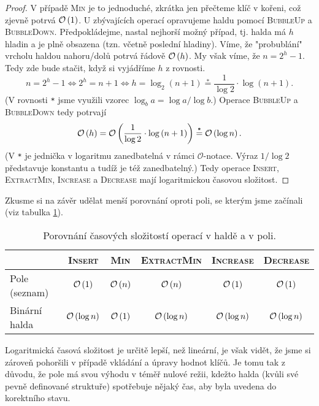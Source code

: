 \begin{proof}
    V případě \textsc{Min} je to jednoduché, zkrátka jen přečteme klíč v kořeni, což zjevně potrvá $\mathcal{O}\left(1\right)$. U zbývajících operací opravujeme haldu pomocí \textsc{BubbleUp} a \textsc{BubbleDown}. Předpokládejme, nastal nejhorší možný případ, tj. halda má $h$ hladin a je plně obsazena (tzn. včetně poslední hladiny). Víme, že "probublání" vrcholu haldou nahoru/dolů potrvá řádově $\mathcal{O}\left(h\right)$. My však víme, že $n=2^h-1$. Tedy zde bude stačit, když si vyjádříme $h$ z rovnosti.
    \[n=2^h-1 \iff 2^h=n+1 \iff h=\log_2{(n+1)}\stackrel{\texttt{*}}{=}\dfrac{1}{\log{2}}\cdot\log{(n+1)}.\]
    (V rovnosti \texttt{*} jsme využili vzorec $\log_b{a}=\log{a}/\log{b}$.) Operace \textsc{BubbleUp} a \textsc{BubbleDown} tedy potrvají
    \[\mathcal{O}\left(h\right)=\mathcal{O}\left(\dfrac{1}{\log{2}}\cdot\log{(n+1)}\right)\stackrel{\texttt{*}}{=}\mathcal{O}\left(\log{n}\right).\]
    (V \texttt{*} je jednička v logaritmu zanedbatelná v rámci $\mathcal{O}$-notace. Výraz $1/\log{2}$ představuje konstantu a tudíž je též zanedbatelný.) Tedy operace \textsc{Insert}, \textsc{ExtractMin}, \textsc{Increase} a \textsc{Decrease} mají logaritmickou časovou složitost.
\end{proof}
Zkusme si na závěr udělat menší porovnání oproti poli, se kterým jsme začínali (viz tabulka \ref{tab:halda_pole_operace}).
\begin{table}[h]
    \centering
    \begin{tabular}{l|ccccc}
                  & \textsc{Insert} & \textsc{Min} & \textsc{ExtractMin} & \textsc{Increase} & \textsc{Decrease} \\\hline
    Pole (seznam) & $\mathcal{O}\left(1\right)$                       & $\mathcal{O}\left(n\right)$                    & $\mathcal{O}\left(n\right)$                           & $\mathcal{O}\left(1\right)$                         & $\mathcal{O}\left(1\right)$                         \\
    Binární halda & $\mathcal{O}\left(\log{n}\right)$                 & $\mathcal{O}\left(1\right)$                    & $\mathcal{O}\left(\log{n}\right)$                     & $\mathcal{O}\left(\log{n}\right)$                   & $\mathcal{O}\left(\log{n}\right)$                  
    \end{tabular}
    \caption{Porovnání časových složitostí operací v haldě a v poli.}
    \label{tab:halda_pole_operace}
\end{table}
Logaritmická časová složitost je určitě lepší, než lineární, je však vidět, že jsme si zároveň pohoršili v případě vkládání a úpravy hodnot klíčů. Je tomu tak z důvodu, že pole má svou výhodu v téměř nulové režii, kdežto halda (kvůli své pevně definované struktuře) spotřebuje nějaký čas, aby byla uvedena do korektního stavu.
